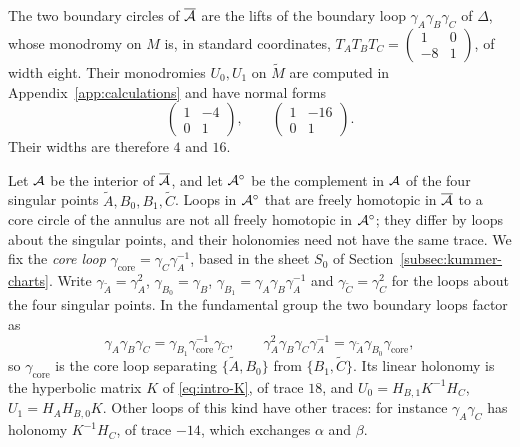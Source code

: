 The two boundary circles of $\overline{\mathcal A}$ are the lifts of the boundary
loop $\gamma_A\gamma_B\gamma_C$ of $\Delta$, whose monodromy on $M$ is, in
standard coordinates,
$T_AT_BT_C=\begin{pmatrix}1&0\\-8&1\end{pmatrix}$, of width eight.  Their
monodromies $U_0,U_1$ on $\widetilde M$ are computed in
Appendix~\ref{app:calculations} and have normal forms
\begin{equation}\label{eq:boundary-holonomies}
 \begin{pmatrix}1&-4\\0&1\end{pmatrix},
 \qquad
 \begin{pmatrix}1&-16\\0&1\end{pmatrix}.
\end{equation}
Their widths are therefore $4$ and $16$.

Let $\mathcal A$ be the interior of $\overline{\mathcal A}$, and let $\mathcal A^\circ$ be the
complement in $\mathcal A$ of the four singular points
$\widetilde A,B_0,B_1,\widetilde C$.  Loops in $\mathcal A^\circ$ that are freely
homotopic in $\overline{\mathcal A}$ to a core circle of the annulus are not all
freely homotopic in $\mathcal A^\circ$; they differ by loops about the singular
points, and their holonomies need not have the same trace.  We fix the
\emph{core loop} $\gamma_{\mathrm{core}}=\gamma_C\gamma_A^{-1}$, based in the
sheet $S_0$ of Section~\ref{subsec:kummer-charts}.  Write
$\gamma_{\widetilde A}=\gamma_A^2$, $\gamma_{B_0}=\gamma_B$,
$\gamma_{B_1}=\gamma_A\gamma_B\gamma_A^{-1}$ and
$\gamma_{\widetilde C}=\gamma_C^2$ for the loops about the four singular
points.  In the fundamental group the two boundary loops factor as
\[
 \gamma_A\gamma_B\gamma_C
 =\gamma_{B_1}\gamma_{\mathrm{core}}^{-1}\gamma_{\widetilde C},
 \qquad
 \gamma_A^2\gamma_B\gamma_C\gamma_A^{-1}
 =\gamma_{\widetilde A}\gamma_{B_0}\gamma_{\mathrm{core}},
\]
so $\gamma_{\mathrm{core}}$ is the core loop separating
$\{\widetilde A,B_0\}$ from $\{B_1,\widetilde C\}$.  Its linear holonomy is
the hyperbolic matrix $K$ of \eqref{eq:intro-K}, of trace $18$, and
$U_0=H_{B,1}K^{-1}H_C$, $U_1=H_AH_{B,0}K$.  Other loops of this kind
have other traces: for instance $\gamma_A\gamma_C$ has holonomy
$K^{-1}H_C$, of trace $-14$, which exchanges $\alpha$ and $\beta$.

